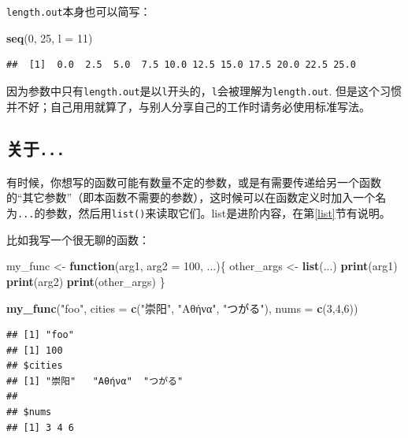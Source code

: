 \documentclass[]{book}
\newenvironment{Shaded}{\begin{snugshade}}{\end{snugshade}}
\newcommand{\ControlFlowTok}[1]{\textcolor[rgb]{0.13,0.29,0.53}{\textbf{#1}}}
\newcommand{\DataTypeTok}[1]{\textcolor[rgb]{0.13,0.29,0.53}{#1}}
\newcommand{\DecValTok}[1]{\textcolor[rgb]{0.00,0.00,0.81}{#1}}
\newcommand{\KeywordTok}[1]{\textcolor[rgb]{0.13,0.29,0.53}{\textbf{#1}}}
\newcommand{\NormalTok}[1]{#1}
\newcommand{\StringTok}[1]{\textcolor[rgb]{0.31,0.60,0.02}{#1}}
\begin{document}
\texttt{length.out}本身也可以简写：

\begin{Shaded}
\begin{Highlighting}[]
\KeywordTok{seq}\NormalTok{(}\DecValTok{0}\NormalTok{, }\DecValTok{25}\NormalTok{, }\DataTypeTok{l =} \DecValTok{11}\NormalTok{)}
\end{Highlighting}
\end{Shaded}

\begin{verbatim}
##  [1]  0.0  2.5  5.0  7.5 10.0 12.5 15.0 17.5 20.0 22.5 25.0
\end{verbatim}

因为参数中只有\texttt{length.out}是以\texttt{l}开头的，\texttt{l}会被理解为\texttt{length.out}. 但是这个习惯并不好；自己用用就算了，与别人分享自己的工作时请务必使用标准写法。

\hypertarget{...}{%
\subsection{\texorpdfstring{关于\texttt{...}}{关于...}}\label{...}}

有时候，你想写的函数可能有数量不定的参数，或是有需要传递给另一个函数的``其它参数''（即本函数不需要的参数），这时候可以在函数定义时加入一个名为\texttt{...}的参数，然后用\texttt{list()}来读取它们。list是进阶内容，在第\ref{list}节有说明。

比如我写一个很无聊的函数：

\begin{Shaded}
\begin{Highlighting}[]
\NormalTok{my_func <-}\StringTok{ }\ControlFlowTok{function}\NormalTok{(arg1, }\DataTypeTok{arg2 =} \DecValTok{100}\NormalTok{, ...)\{}
\NormalTok{  other_args <-}\StringTok{ }\KeywordTok{list}\NormalTok{(...)}
  \KeywordTok{print}\NormalTok{(arg1)}
  \KeywordTok{print}\NormalTok{(arg2)}
  \KeywordTok{print}\NormalTok{(other_args)}
\NormalTok{\}}

\KeywordTok{my_func}\NormalTok{(}\StringTok{"foo"}\NormalTok{, }\DataTypeTok{cities =} \KeywordTok{c}\NormalTok{(}\StringTok{"崇阳"}\NormalTok{, }\StringTok{"Αθήνα"}\NormalTok{, }\StringTok{"つがる"}\NormalTok{), }\DataTypeTok{nums =} \KeywordTok{c}\NormalTok{(}\DecValTok{3}\NormalTok{,}\DecValTok{4}\NormalTok{,}\DecValTok{6}\NormalTok{))}
\end{Highlighting}
\end{Shaded}

\begin{verbatim}
## [1] "foo"
## [1] 100
## $cities
## [1] "崇阳"   "Αθήνα"  "つがる"
## 
## $nums
## [1] 3 4 6
\end{verbatim}
\end{document}
